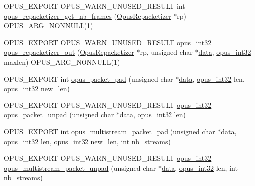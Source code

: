 \begin{DoxyCompactItemize}
\item 
O\+P\+U\+S\+\_\+\+E\+X\+P\+O\+RT O\+P\+U\+S\+\_\+\+W\+A\+R\+N\+\_\+\+U\+N\+U\+S\+E\+D\+\_\+\+R\+E\+S\+U\+LT int \hyperlink{group__opus__repacketizer_ga0abed93ad18e8b2bd8b5bd10189c3e97}{opus\+\_\+repacketizer\+\_\+get\+\_\+nb\+\_\+frames} (\hyperlink{group__opus__repacketizer_ga1f85070a64bcbf5bf24f5ccb80323e7b}{Opus\+Repacketizer} $\ast$rp) O\+P\+U\+S\+\_\+\+A\+R\+G\+\_\+\+N\+O\+N\+N\+U\+LL(1)
\item 
O\+P\+U\+S\+\_\+\+E\+X\+P\+O\+RT O\+P\+U\+S\+\_\+\+W\+A\+R\+N\+\_\+\+U\+N\+U\+S\+E\+D\+\_\+\+R\+E\+S\+U\+LT \hyperlink{opus__types_8h_aa4d309d6f80b99dbabebc8f98879ab9a}{opus\+\_\+int32} \hyperlink{group__opus__repacketizer_gaa1b5f68279829dcbaf31d374b2f3eac4}{opus\+\_\+repacketizer\+\_\+out} (\hyperlink{group__opus__repacketizer_ga1f85070a64bcbf5bf24f5ccb80323e7b}{Opus\+Repacketizer} $\ast$rp, unsigned char $\ast$\hyperlink{jpeglib_8h_aa379dc8ae39e55ae0c431a61a7d2f2bc}{data}, \hyperlink{opus__types_8h_aa4d309d6f80b99dbabebc8f98879ab9a}{opus\+\_\+int32} maxlen) O\+P\+U\+S\+\_\+\+A\+R\+G\+\_\+\+N\+O\+N\+N\+U\+LL(1)
\item 
O\+P\+U\+S\+\_\+\+E\+X\+P\+O\+RT int \hyperlink{group__opus__repacketizer_ga902a178e79f5b49721c8fb3a5f7d1e5b}{opus\+\_\+packet\+\_\+pad} (unsigned char $\ast$\hyperlink{jpeglib_8h_aa379dc8ae39e55ae0c431a61a7d2f2bc}{data}, \hyperlink{opus__types_8h_aa4d309d6f80b99dbabebc8f98879ab9a}{opus\+\_\+int32} len, \hyperlink{opus__types_8h_aa4d309d6f80b99dbabebc8f98879ab9a}{opus\+\_\+int32} new\+\_\+len)
\item 
O\+P\+U\+S\+\_\+\+E\+X\+P\+O\+RT O\+P\+U\+S\+\_\+\+W\+A\+R\+N\+\_\+\+U\+N\+U\+S\+E\+D\+\_\+\+R\+E\+S\+U\+LT \hyperlink{opus__types_8h_aa4d309d6f80b99dbabebc8f98879ab9a}{opus\+\_\+int32} \hyperlink{group__opus__repacketizer_ga87aaad8db1ec8a4b634415e7b3a84835}{opus\+\_\+packet\+\_\+unpad} (unsigned char $\ast$\hyperlink{jpeglib_8h_aa379dc8ae39e55ae0c431a61a7d2f2bc}{data}, \hyperlink{opus__types_8h_aa4d309d6f80b99dbabebc8f98879ab9a}{opus\+\_\+int32} len)
\item 
O\+P\+U\+S\+\_\+\+E\+X\+P\+O\+RT int \hyperlink{group__opus__repacketizer_ga00e20e143f8edf570710036fa07941cb}{opus\+\_\+multistream\+\_\+packet\+\_\+pad} (unsigned char $\ast$\hyperlink{jpeglib_8h_aa379dc8ae39e55ae0c431a61a7d2f2bc}{data}, \hyperlink{opus__types_8h_aa4d309d6f80b99dbabebc8f98879ab9a}{opus\+\_\+int32} len, \hyperlink{opus__types_8h_aa4d309d6f80b99dbabebc8f98879ab9a}{opus\+\_\+int32} new\+\_\+len, int nb\+\_\+streams)
\item 
O\+P\+U\+S\+\_\+\+E\+X\+P\+O\+RT O\+P\+U\+S\+\_\+\+W\+A\+R\+N\+\_\+\+U\+N\+U\+S\+E\+D\+\_\+\+R\+E\+S\+U\+LT \hyperlink{opus__types_8h_aa4d309d6f80b99dbabebc8f98879ab9a}{opus\+\_\+int32} \hyperlink{group__opus__repacketizer_ga37cb0efda17994e2d9ab7d31d013276e}{opus\+\_\+multistream\+\_\+packet\+\_\+unpad} (unsigned char $\ast$\hyperlink{jpeglib_8h_aa379dc8ae39e55ae0c431a61a7d2f2bc}{data}, \hyperlink{opus__types_8h_aa4d309d6f80b99dbabebc8f98879ab9a}{opus\+\_\+int32} len, int nb\+\_\+streams)
\end{DoxyCompactItemize}


